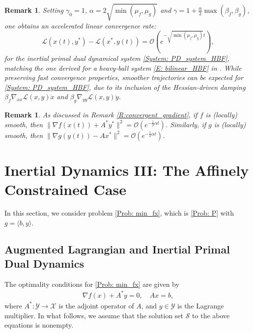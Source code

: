 \documentclass[pdflatex,sn-mathphys-num]{sn-jnl}
\theoremstyle{thmstyleone}
\theoremstyle{thmstyletwo}
\newtheorem{remark}[theorem]{Remark}
\theoremstyle{thmstylethree}
\newcommand{\X}{\mathcal{X}}
\newcommand{\Y}{\mathcal{Y}}
\begin{document}
\begin{remark}
Setting $\gamma_0=1$, $\alpha = 2\sqrt{\min(\mu_f,\mu_g)}$ and $\gamma = 1 + \frac{\alpha}{2} \max(\beta_f,\beta_g)$, one obtains an accelerated linear convergence rate:
$$ \mathcal{L}(x(t),y^*) - \mathcal{L}(x^*,y(t)) = \mathcal{O}\left( e^{-\sqrt{\min(\mu_f,\mu_g)} t} \right), $$
for the inertial primal dual dynamical system \eqref{System: PD_system_HBF}, matching the one derived for a heavy-ball system \eqref{E: bilinear_HBF} in \cite{He_2025_PD_SC}. While preserving fast convergence properties, smoother trajectories can be expected for \eqref{System: PD_system_HBF}, due to its inclusion of the Hessian-driven damping $\beta_f\nabla_{xx}\mathcal{L}(x,y)\dot{x}$ and $\beta_g\nabla_{yy}\mathcal{L}(x,y)\dot{y}$.
\end{remark}

\begin{remark} \label{R:convergent_gradient_bis}
    As discussed in Remark \ref{R:convergent_gradient}, if $f$ is (locally) smooth, then $\|\nabla f(x(t))+A^*y^*\|^2=\mathcal{O}\left( e^{-\frac{1}{2}\alpha t} \right)$. Similarly, if $g$ is (locally) smooth, then $\|\nabla g(y(t))-Ax^*\|^2=\mathcal{O}\left( e^{-\frac{1}{2}\alpha t} \right)$.
\end{remark}


\section{Inertial Dynamics III: The Affinely Constrained Case}\label{Sec: affine convex}
In this section, we consider problem \eqref{Prob: min_fx}, which is \eqref{Prob: P} with $g=\langle b, y\rangle$.




\subsection{Augmented Lagrangian and Inertial Primal Dual Dynamics}\label{Sec: ALM}
The optimality conditions for \eqref{Prob: min_fx} are given by
\begin{equation}\label{E: opt_cond}
\begin{aligned}
\nabla f(x) + A^* y = 0,\quad
Ax = b,
\end{aligned}
\end{equation} 
where $A^*:\Y\to\X$ is the adjoint operator of $A$, and $y\in\Y$ is the Lagrange multiplier. In what follows, we assume that the solution set $\mathcal{S}$ to the above equations is nonempty.
\end{document}
